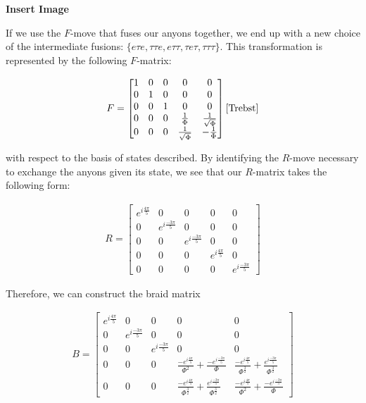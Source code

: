 \documentclass[10pt]{ucthesis}
\begin{document}
\textbf{Insert Image}

If we use the $F$-move that fuses our anyons together, we end up with a new choice of the intermediate fusions: $\{e\tau e,\tau\tau e, e\tau\tau, \tau e\tau, \tau\tau\tau\}$. This transformation is represented by the following $F$-matrix:

\begin{equation}
	\begin{aligned}
		F = \begin{bmatrix}
				1 & 0 & 0 & 0 & 0 \\
				0 & 1 & 0 & 0 & 0 \\
				0 & 0 & 1 & 0 & 0 \\
				0 & 0 & 0 & \frac{1}{\Phi} & \frac{1}{\sqrt{\Phi}}\\
				0 & 0 & 0 &\frac{1}{\sqrt{\Phi}} & -\frac{1}{\Phi}
			\end{bmatrix}\cite{Trebst}
	\end{aligned}
\end{equation}

with respect to the basis of states described. By identifying the $R$-move necessary to exchange the anyons given its state, we see that our $R$-matrix takes the following form:

\begin{equation}
	\begin{aligned}
		R = \begin{bmatrix}
				e^{i\frac{4\pi}{5}} & 0 & 0 & 0 & 0 \\
				0 & e^{i\frac{-3\pi}{5}} & 0 & 0 & 0 \\
				0 & 0 & e^{i\frac{-3\pi}{5}} & 0 & 0 \\
				0 & 0 & 0 & e^{i\frac{4\pi}{5}} & 0\\
				0 & 0 & 0 & 0 &e^{i\frac{-3\pi}{5}} 
			\end{bmatrix}
	\end{aligned}
\end{equation}

Therefore, we can construct the braid matrix

\begin{equation}
	\begin{aligned}
		B = \begin{bmatrix}
				e^{i\frac{4\pi}{5}} & 0 & 0 & 0 & 0 \\
				0 & e^{i\frac{-3\pi}{5}} & 0 & 0 & 0 \\
				0 & 0 & e^{i\frac{-3\pi}{5}} & 0 & 0 \\
				0 & 0 & 0 & \frac{-e^{i\frac{4\pi}{5}}}{\Phi^2} + \frac{-e^{i\frac{-3\pi}{5}}}{\Phi}& \frac{-e^{i\frac{4\pi}{5}}}{\Phi^\frac{3}{2}} + \frac{e^{i\frac{-3\pi}{5}}}{\Phi^\frac{3}{2}}\\
				0 & 0 & 0&\frac{-e^{i\frac{4\pi}{5}}}{\Phi^\frac{3}{2}} + \frac{e^{i\frac{-3\pi}{5}}}{\Phi^\frac{3}{2}} &\frac{-e^{i\frac{4\pi}{5}}}{\Phi^2} + \frac{-e^{i\frac{-3\pi}{5}}}{\Phi}
			\end{bmatrix}
	\end{aligned}
\end{equation}
\end{document}
